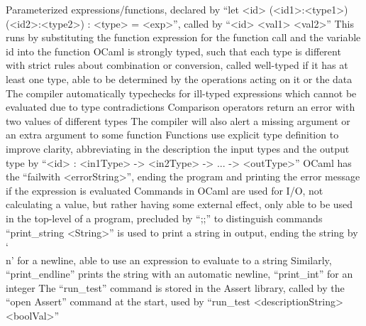 \documentclass[11 pt, twoside]{article}
\newenvironment{outline*}
{
	\begin{outline}[enumerate]
	}
	{\end{outline}
}
\begin{document}
\begin{outline*}
\2 Parameterized expressions/functions, declared by ``let <id> (<id1>:<type1>) (<id2>:<type2>) : <type> = <exp>'', called by ``<id> <val1> <val2>''
\3 This runs by substituting the function expression for the function call and the variable id into the function
\1 OCaml is strongly typed, such that each type is different with strict rules about combination or conversion, called well-typed if it has at least one type, able to be determined by the operations acting on it or the data
\2 The compiler automatically typechecks for ill-typed expressions which cannot be evaluated due to type contradictions
\3 Comparison operators return an error with two values of different types
\3 The compiler will also alert a missing argument or an extra argument to some function
\2 Functions use explicit type definition to improve clarity, abbreviating in the description the input types and the output type by ``<id> : <in1Type> -> <in2Type> -> ... -> <outType>''
\1 OCaml has the ``failwith <errorString>'', ending the program and printing the error message if the expression is evaluated
\1 Commands in OCaml are used for I/O, not calculating a value, but rather having some external effect, only able to be used in the top-level of a program, precluded by ``;;'' to distinguish commands
\2 ``print\_string <String>'' is used to print a string in output, ending the string by `\\n' for a newline, able to use an expression to evaluate to a string
\3 Similarly, ``print\_endline'' prints the string with an automatic newline, ``print\_int'' for an integer
\2 The ``run\_test'' command is stored in the Assert library, called by the ``open Assert'' command at the start, used by ``run\_test <descriptionString> <boolVal>''
\end{outline*}
\end{document}
